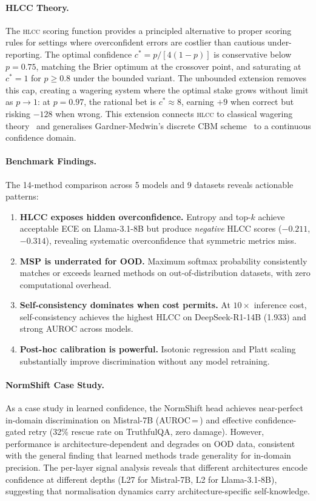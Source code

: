 \documentclass[11pt,a4paper]{article}
\newcommand{\hlcc}{\textsc{hlcc}}
\newcommand{\cstar}{c^{*}}
\begin{document}
\paragraph{HLCC Theory.}
The \hlcc{} scoring function provides a principled alternative to proper
scoring rules for settings where overconfident errors are costlier than
cautious under-reporting.  The optimal confidence $\cstar = p/[4(1{-}p)]$
is conservative below $p = 0.75$, matching the Brier optimum at the
crossover point, and saturating at $\cstar = 1$ for $p \geq 0.8$ under
the bounded variant.  The unbounded extension removes this cap, creating
a wagering system where the optimal stake grows without limit as
$p \to 1$: at $p = 0.97$, the rational bet is $\cstar \approx 8$,
earning $+9$ when correct but risking $-128$ when wrong.  This
extension connects \hlcc{} to classical wagering
theory~\cite{kelly1956} and generalises Gardner-Medwin's discrete
CBM scheme~\cite{gardnermedwin2006} to a continuous confidence
domain.

\paragraph{Benchmark Findings.}
The 14-method comparison across 5 models and 9 datasets reveals
actionable patterns:
\begin{enumerate}[nosep]
  \item \textbf{HLCC exposes hidden overconfidence.}  Entropy and
        top-$k$ achieve acceptable ECE on Llama-3.1-8B but produce
        \emph{negative} HLCC scores ($-0.211$, $-0.314$), revealing
        systematic overconfidence that symmetric metrics miss.
  \item \textbf{MSP is underrated for OOD.}  Maximum softmax probability
        consistently matches or exceeds learned methods on
        out-of-distribution datasets, with zero computational overhead.
  \item \textbf{Self-consistency dominates when cost permits.}
        At $10\times$ inference cost, self-consistency achieves the
        highest HLCC on DeepSeek-R1-14B (1.933) and strong AUROC
        across models.
  \item \textbf{Post-hoc calibration is powerful.}  Isotonic regression
        and Platt scaling substantially improve discrimination without
        any model retraining.
\end{enumerate}

\paragraph{NormShift Case Study.}
As a case study in learned confidence, the NormShift head achieves
near-perfect in-domain discrimination on Mistral-7B
(AUROC\,=\,\mistralNormShiftAUROC{}) and effective confidence-gated
retry (32\% rescue rate on TruthfulQA, zero damage).  However,
performance is architecture-dependent and degrades on OOD data,
consistent with the general finding that learned methods trade
generality for in-domain precision.  The per-layer signal analysis
reveals that different architectures encode confidence at different
depths (L27 for Mistral-7B, L2 for Llama-3.1-8B), suggesting that
normalisation dynamics carry architecture-specific self-knowledge.
\end{document}

